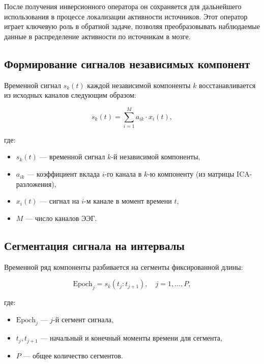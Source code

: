 После получения инверсионного оператора он сохраняется для дальнейшего использования в процессе локализации активности источников. Этот оператор играет ключевую роль в обратной задаче, позволяя преобразовывать наблюдаемые данные в распределение активности по источникам в мозге.


\subsection{Формирование сигналов независимых компонент}

Временной сигнал \(s_k(t)\) каждой независимой компоненты \(k\) восстанавливается из исходных каналов следующим образом:

\begin{equation}
s_k(t) = \sum_{i=1}^{M} a_{ik} \cdot x_i(t),
\label{eq:ica_signal}
\end{equation}

где:
\begin{itemize}
    \item \(s_k(t)\) — временной сигнал \(k\)-й независимой компоненты,
    \item \(a_{ik}\) — коэффициент вклада \(i\)-го канала в \(k\)-ю компоненту (из матрицы ICA-разложения),
    \item \(x_i(t)\) — сигнал на \(i\)-м канале в момент времени \(t\),
    \item \(M\) — число каналов ЭЭГ.
\end{itemize}

\subsection{Сегментация сигнала на интервалы}

Временной ряд компоненты разбивается на сегменты фиксированной длины:

\begin{equation}
\text{Epoch}_j = s_k(t_j : t_{j+1}), \quad j = 1, \dots, P,
\label{eq:segmentation}
\end{equation}

где:
\begin{itemize}
    \item \(\text{Epoch}_j\) — \(j\)-й сегмент сигнала,
    \item \(t_j, t_{j+1}\) — начальный и конечный моменты времени для сегмента,
    \item \(P\) — общее количество сегментов.
\end{itemize}

